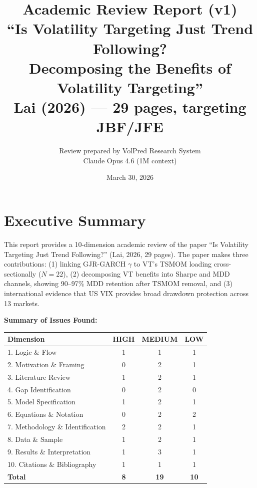 \documentclass[12pt,a4paper]{article}
\title{Academic Review Report (v1)\\
\Large ``Is Volatility Targeting Just Trend Following?\\
Decomposing the Benefits of Volatility Targeting''\\[6pt]
\normalsize Lai (2026) --- 29 pages, targeting JBF/JFE}
\author{Review prepared by VolPred Research System\\
\small Claude Opus 4.6 (1M context)}
\date{March 30, 2026}
\begin{document}
\maketitle

\tableofcontents
\newpage

\section{Executive Summary}

This report provides a 10-dimension academic review of the paper ``Is Volatility Targeting Just Trend Following?'' (Lai, 2026, 29 pages). The paper makes three contributions: (1) linking GJR-GARCH $\gamma$ to VT's TSMOM loading cross-sectionally ($N=22$), (2) decomposing VT benefits into Sharpe and MDD channels, showing 90--97\% MDD retention after TSMOM removal, and (3) international evidence that US VIX provides broad drawdown protection across 13 markets.

\medskip
\noindent\textbf{Summary of Issues Found:}

\begin{center}
\begin{tabular}{lccc}
\toprule
Dimension & HIGH & MEDIUM & LOW \\
\midrule
1. Logic \& Flow              & 1 & 1 & 1 \\
2. Motivation \& Framing      & 0 & 2 & 1 \\
3. Literature Review           & 1 & 2 & 1 \\
4. Gap Identification          & 0 & 2 & 0 \\
5. Model Specification         & 1 & 2 & 1 \\
6. Equations \& Notation       & 0 & 2 & 2 \\
7. Methodology \& Identification & 2 & 2 & 1 \\
8. Data \& Sample              & 1 & 2 & 1 \\
9. Results \& Interpretation   & 1 & 3 & 1 \\
10. Citations \& Bibliography  & 1 & 1 & 1 \\
\midrule
\textbf{Total}                 & \textbf{8} & \textbf{19} & \textbf{10} \\
\bottomrule
\end{tabular}
\end{center}
\end{document}
